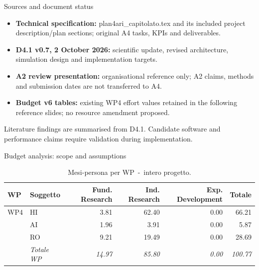 \documentclass[aspectratio=169,10pt]{beamer}
\begin{document}
\begin{frame}{Sources and document status}
\small
\begin{itemize}\items
\item \textbf{Technical specification:} plan4ari\_capitolato.tex and its included project description/plan sections; original A4 tasks, KPIs and deliverables.
\item \textbf{D4.1 v0.7, 2 October 2026:} scientific update, revised architecture, simulation design and implementation targets.
\item \textbf{A2 review presentation:} organisational reference only; A2 claims, methods and submission dates are not transferred to A4.
\item \textbf{Budget v6 tables:} existing WP4 effort values retained in the following reference slides; no resource amendment proposed.
\end{itemize}
\small Literature findings are summarised from D4.1. Candidate software and performance claims require validation during implementation.
\end{frame}

\begin{frame}{Budget analysis: scope and assumptions}


\begin{table}[H]\centering\scriptsize\caption{Mesi-persona per WP~-~intero progetto.}\label{tab:wp-w-tot}
\begin{tabular}{llrrrr}\toprule\textbf{WP} & \textbf{Soggetto} & \textbf{Fund. Research} & \textbf{Ind. Research} & \textbf{Exp. Development} & \textbf{Totale} \\\midrule
WP4 & HI & 3.81 & 62.40 & 0.00 & 66.21 \\
 & AI & 1.96 & 3.91 & 0.00 & 5.87 \\
 & RO & 9.21 & 19.49 & 0.00 & 28.69 \\
 & \textit{Totale WP} & \textit{14.97} & \textit{85.80} & \textit{0.00} & \textit{100.77} \\
\bottomrule\end{tabular}
\end{table}

\end{frame}
\end{document}
